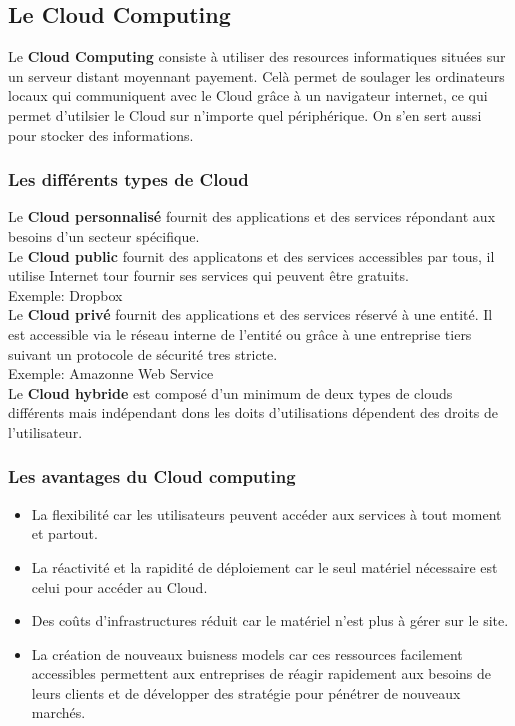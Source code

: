  \subsection{Le Cloud Computing}
 Le \textbf{Cloud Computing} consiste à utiliser des resources informatiques situées sur un serveur distant moyennant payement. Celà permet de soulager les ordinateurs locaux qui communiquent avec le Cloud grâce à un navigateur internet, ce qui permet d'utilsier le Cloud sur n'importe quel périphérique. On s'en sert aussi pour stocker des informations.
 \subsubsection{Les différents types de Cloud}
 Le \textbf{Cloud personnalisé} fournit des applications et des services répondant aux besoins d'un secteur spécifique.\\

 \indent
 Le \textbf{Cloud public} fournit des applicatons et des services accessibles par tous, il utilise Internet tour fournir ses services qui peuvent être gratuits.\\
 Exemple: Dropbox\\

 \indent
 Le \textbf{Cloud privé} fournit des applications et des services réservé à une entité. Il est accessible via le réseau interne de l'entité ou grâce à une entreprise tiers suivant un protocole de sécurité tres stricte.\\
 Exemple: Amazonne Web Service\\

 \indent
 Le \textbf{Cloud hybride} est composé d'un minimum de deux types de clouds différents mais indépendant dons les doits d'utilisations dépendent des droits de l'utilisateur.

 \subsubsection{Les avantages du Cloud computing}
 \begin{itemize}
	 \item La flexibilité car les utilisateurs peuvent accéder aux services à tout moment et partout.
	 \item La réactivité et la rapidité de déploiement car le seul matériel nécessaire est celui pour accéder au Cloud.
	 \item Des coûts d'infrastructures réduit car le matériel n'est plus à gérer sur le site.%
	 \item La création de nouveaux buisness models car ces ressources facilement accessibles permettent aux entreprises de réagir rapidement aux besoins de leurs clients et de développer des stratégie pour pénétrer de nouveaux marchés.
 \end{itemize}

